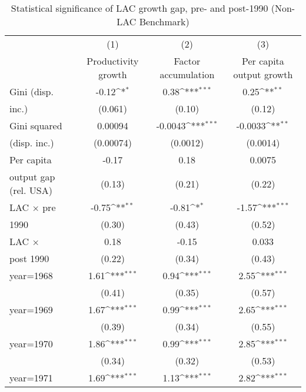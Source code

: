 \begin{sidewaystable}[htbp]\centering
\def\sym#1{\ifmmode^{#1}\else\(^{#1}\)\fi}
\caption{Statistical significance of LAC growth gap, pre- and post-1990 (Non-LAC Benchmark)}
\begin{tabular}{l*{3}{c}}
\toprule
                &\multicolumn{1}{c}{(1)}&\multicolumn{1}{c}{(2)}&\multicolumn{1}{c}{(3)}\\
                &\multicolumn{1}{c}{Productivity growth}&\multicolumn{1}{c}{Factor accumulation}&\multicolumn{1}{c}{Per capita output growth}\\
\midrule
Gini (disp.     &    -0.12\sym{*}  &     0.38\sym{***}&     0.25\sym{**} \\
inc.)           &  (0.061)         &   (0.10)         &   (0.12)         \\
\addlinespace
Gini squared    &  0.00094         &  -0.0043\sym{***}&  -0.0033\sym{**} \\
(disp. inc.)    &(0.00074)         & (0.0012)         & (0.0014)         \\
\addlinespace
Per capita      &    -0.17         &     0.18         &   0.0075         \\
output gap (rel. USA)&   (0.13)         &   (0.21)         &   (0.22)         \\
\addlinespace
LAC $\times$ pre&    -0.75\sym{**} &    -0.81\sym{*}  &    -1.57\sym{***}\\
1990            &   (0.30)         &   (0.43)         &   (0.52)         \\
\addlinespace
LAC $\times$    &     0.18         &    -0.15         &    0.033         \\
post 1990       &   (0.22)         &   (0.34)         &   (0.43)         \\
\addlinespace
year=1968       &     1.61\sym{***}&     0.94\sym{***}&     2.55\sym{***}\\
                &   (0.41)         &   (0.35)         &   (0.57)         \\
\addlinespace
year=1969       &     1.67\sym{***}&     0.99\sym{***}&     2.65\sym{***}\\
                &   (0.39)         &   (0.34)         &   (0.55)         \\
\addlinespace
year=1970       &     1.86\sym{***}&     0.99\sym{***}&     2.85\sym{***}\\
                &   (0.34)         &   (0.32)         &   (0.53)         \\
\addlinespace
year=1971       &     1.69\sym{***}&     1.13\sym{***}&     2.82\sym{***}\\

\end{tabular}
\end{sidewaystable}
